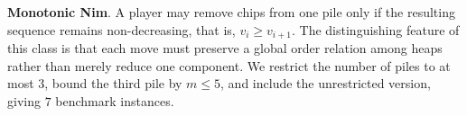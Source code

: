\documentclass[review]{elsarticle}
\newcommand{\set}[1]{\{ #1 \}}
\newcommand{\tuple}[1]{\langle {#1} \rangle}
\newcommand{\true}{\top}
\newcommand{\statevar}{\mathcal{X}}
\newcommand{\act}{\mathcal{A}}
\newcommand{\constraint}{\mathcal{C}}
\newcommand{\estate}{\mathcal{E}}
\newcommand{\pre}{\mathtt{pre}}
\newcommand{\eff}{\mathtt{eff}}
\begin{document}
{\color{red}\textbf{Monotonic Nim}. A player may remove chips from one pile only if the resulting sequence remains non-decreasing, that is, $v_i \ge v_{i+1}$.}
{\color{red}The distinguishing feature of this class is that each move must preserve a global order relation among heaps rather than merely reduce one component.}
{\color{red}We restrict the number of piles to at most $3$, bound the third pile by $m \le 5$, and include the unrestricted version, giving $7$ benchmark instances.}
\end{document}
